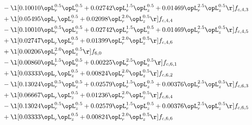 \begin{alignat}{2}
& - \l[  0.10010 \opL_r^{0.5} \opL_z^{0.5} +  0.02742 \opL_r^{1.5} \opL_z^{0.5} +  0.01469 \opL_r^{2.5} \opL_z^{0.5}  \r] f_{c,4,3} \nonumber \\ 
& + \l[  0.05495 \opL_r \opL_z^{0.5} +  0.02098 \opL_r^{2.0} \opL_z^{0.5}  \r] f_{c,4,4} \nonumber \\ 
& - \l[  0.10010 \opL_r^{0.5} \opL_z^{0.5} +  0.02742 \opL_r^{1.5} \opL_z^{0.5} +  0.01469 \opL_r^{2.5} \opL_z^{0.5}  \r] f_{c,4,5} \nonumber \\ 
& + \l[  0.02747 \opL_r \opL_z^{0.5} +  0.01399 \opL_r^{2.0} \opL_z^{0.5}  \r] f_{c,4,6} \nonumber \\ 
& + \l[  0.00206 \opL_r^{2.0} \opL_z^{0.5}  \r] f_{6,0} \nonumber \\ 
& - \l[  0.00860 \opL_r^{1.5} \opL_z^{0.5} +  0.00225 \opL_r^{2.5} \opL_z^{0.5}  \r] f_{c,6,1} \nonumber \\ 
& + \l[  0.03333 \opL_r \opL_z^{0.5} +  0.00824 \opL_r^{2.0} \opL_z^{0.5}  \r] f_{c,6,2} \nonumber \\ 
& - \l[  0.13024 \opL_r^{0.5} \opL_z^{0.5} +  0.02579 \opL_r^{1.5} \opL_z^{0.5} +  0.00376 \opL_r^{2.5} \opL_z^{0.5}  \r] f_{c,6,3} \nonumber \\ 
& + \l[  0.06667 \opL_r \opL_z^{0.5} +  0.01236 \opL_r^{2.0} \opL_z^{0.5}  \r] f_{c,6,4} \nonumber \\ 
& - \l[  0.13024 \opL_r^{0.5} \opL_z^{0.5} +  0.02579 \opL_r^{1.5} \opL_z^{0.5} +  0.00376 \opL_r^{2.5} \opL_z^{0.5}  \r] f_{c,6,5} \nonumber \\ 
& + \l[  0.03333 \opL_r \opL_z^{0.5} +  0.00824 \opL_r^{2.0} \opL_z^{0.5}  \r] f_{c,6,6} \nonumber \\ 
\end{alignat} 


